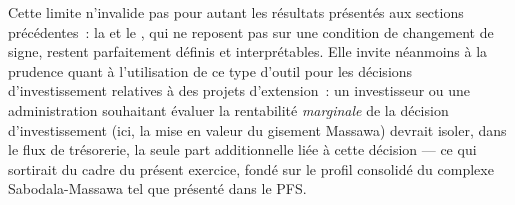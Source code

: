 Cette limite n'invalide pas pour autant les résultats présentés aux sections précédentes~: la \VAN{} et le \TEMI, qui ne reposent pas sur une condition de changement de signe, restent parfaitement définis et interprétables. Elle invite néanmoins à la prudence quant à l'utilisation de ce type d'outil pour les décisions d'investissement relatives à des projets d'extension~: un investisseur ou une administration souhaitant évaluer la rentabilité \emph{marginale} de la décision d'investissement (ici, la mise en valeur du gisement Massawa) devrait isoler, dans le flux de trésorerie, la seule part additionnelle liée à cette décision --- ce qui sortirait du cadre du présent exercice, fondé sur le profil consolidé du complexe Sabodala-Massawa tel que présenté dans le PFS.
